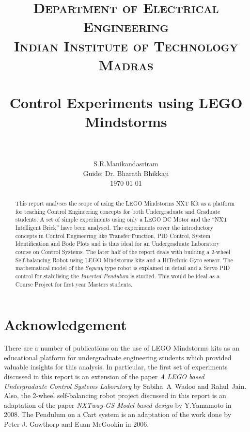 \documentclass[paper=a4, fontsize=11pt]{scrartcl}
\title{
        \usefont{OT1}{bch}{b}{n}
        \normalfont \normalsize \textsc{Department of Electrical Engineering} \\
        \normalfont \normalsize \textsc{Indian Institute of Technology Madras} \\ [25pt]
        \horrule{0.5pt} \\[0.4cm]
        \huge Control Experiments using LEGO Mindstorms \\
        \horrule{2pt} \\[0.5cm]
}
\author{
        \normalfont                                 \normalsize
        S.R.Manikandasriram\\[-3pt]                 \normalsize
        Guide: Dr. Bharath Bhikkaji\\[-3pt]         \normalsize
        \today
}
\date{}
\numberwithin{equation}{section}        %
\numberwithin{figure}{section}          %
\numberwithin{table}{section}           %
\begin{document}
\maketitle

\begin{abstract}
This report analyses the scope of using the LEGO Mindstorms NXT Kit as a platform for teaching Control Engineering concepts for both Undergraduate and Graduate students. A set of simple experiments using only a LEGO DC Motor and the ``NXT Intelligent Brick'' have been analysed. The experiments cover the introductory concepts in Control Engineering like Transfer Function, PID Control, System Identification and Bode Plots and is thus ideal for an Undergraduate Laboratory course on Control Systems. The later half of the report deals with building a 2-wheel Self-balancing Robot using LEGO Mindstorms kits and a HiTechnic Gyro sensor. The mathematical model of the \emph{Segway} type robot is explained in detail and a Servo PID control for stabilising the \emph{Inverted Pendulum} is studied. This would be ideal as a Course Project for first year Masters students.
\end{abstract}

\pagebreak

\section*{Acknowledgement}

There are a number of publications on the use of LEGO Mindstorms kits as an educational platform for undergraduate engineering students which provided valuable insights for this analysis. In particular, the first set of experiments discussed in this report is an extension of the paper \emph{A LEGO based Undergraduate Control Systems Laboratory} by Sabiha~A~Wadoo and Rahul~Jain. Also, the 2-wheel self-balancing robot project discussed in this report is an adaptation of the paper \emph{NXTway-GS Model based design} by Y.Yamamoto in 2008. The Pendulum on a Cart system is an adaptation of the work done by Peter J. Gawthorp and Euan McGookin in 2006.

\pagebreak
\end{document}

